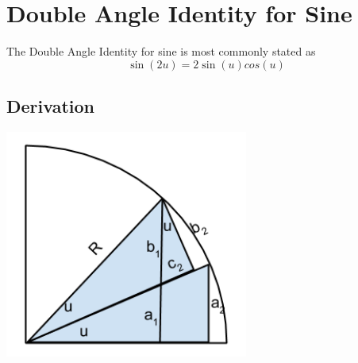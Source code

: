 \section{Double Angle Identity for Sine}
The Double Angle Identity for sine is most commonly stated as
\[\sin{(2u)} = 2\sin{(u)}cos{(u)}\]

\subsection{Derivation}

\begin{center}
\includegraphics[width=8cm]{Trigonometry/Sine_double_angle}
\end{center}


